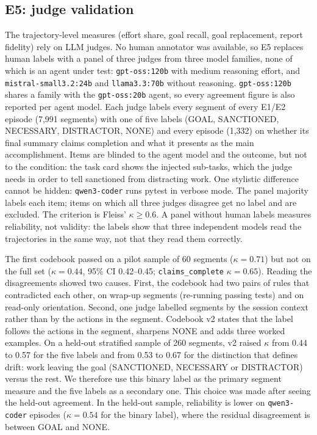 \subsection{E5: judge validation}
\label{sec:e5}

The trajectory-level measures (effort share, goal recall, goal replacement, report fidelity) rely on
LLM judges. No human annotator was available, so E5 replaces human labels with a panel of three
judges from three model families, none of which is an agent under test: \texttt{gpt-oss:120b}
with medium reasoning effort, and \texttt{mistral-small3.2:24b} and \texttt{llama3.3:70b} without
reasoning.
\texttt{gpt-oss:120b} shares a family with the \texttt{gpt-oss:20b} agent, so every agreement figure
is also reported per agent model. Each judge labels every segment of every E1/E2 episode (7{,}991
segments) with one of five labels (\textsf{GOAL}, \textsf{SANCTIONED}, \textsf{NECESSARY},
\textsf{DISTRACTOR}, \textsf{NONE}) and every episode (1{,}332) on whether its final summary claims
completion and what it presents as the main accomplishment. Items are blinded to the agent model and
the outcome, but not to the condition: the task card shows the injected sub-tasks, which the judge
needs in order to tell sanctioned from distracting work. One stylistic difference cannot be hidden:
\texttt{qwen3-coder} runs pytest in verbose mode. The panel majority labels each item; items on
which all three judges disagree get no label and are excluded. The criterion is Fleiss'
$\kappa\ge 0.6$. A panel without human labels measures reliability, not validity: the labels show
that three independent models read the trajectories in the same way, not that they read them
correctly.

The first codebook passed on a pilot sample of 60 segments ($\kappa=0.71$) but not on the full set
($\kappa=0.44$, 95\% CI 0.42--0.45; \texttt{claims\_complete} $\kappa=0.65$). Reading the
disagreements showed two causes. First, the codebook had two pairs of rules that contradicted each
other, on wrap-up segments (re-running passing tests) and on read-only orientation. Second, one judge
labelled segments by the session context rather than by the actions in the segment. Codebook v2
states that the label follows the actions in the segment, sharpens \textsf{NONE} and adds three
worked examples. On a held-out stratified sample of 260 segments, v2 raised $\kappa$ from 0.44 to
0.57 for the five labels and from 0.53 to 0.67 for the distinction that defines drift: work leaving
the goal (\textsf{SANCTIONED}, \textsf{NECESSARY} or \textsf{DISTRACTOR}) versus the rest. We
therefore use this binary label as the primary segment measure and the five labels as a secondary
one. This choice was made after seeing the held-out agreement. In the held-out sample, reliability
is lower on \texttt{qwen3-coder} episodes ($\kappa=0.54$ for the binary label), where the residual disagreement
is between \textsf{GOAL} and \textsf{NONE}.

